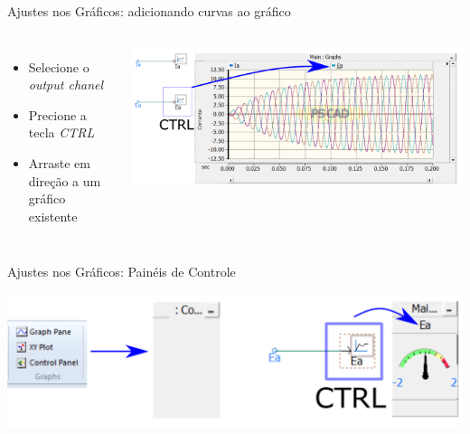\begin{frame}{Ajustes nos Gráficos: adicionando curvas ao gráfico}
\centering


\begin{columns}

\begin{itemize}
\item Selecione o {\it output chanel}
\vspace*{1cm}
\item Precione a tecla {\it CTRL}
\vspace*{1cm}
\item Arraste em direção a um gráfico existente
\end{itemize}


\centering
\includegraphics[width=0.95\linewidth]{./figuras/Visualizacao-resultados/graficos-add-curvas}

\end{columns}





\end{frame}






\begin{frame}{Ajustes nos Gráficos: Painéis de Controle}
\centering



\includegraphics[width=0.95\linewidth]{./figuras/Visualizacao-resultados/graficos-Control-panel}




\end{frame}








%
%
%
%
%



